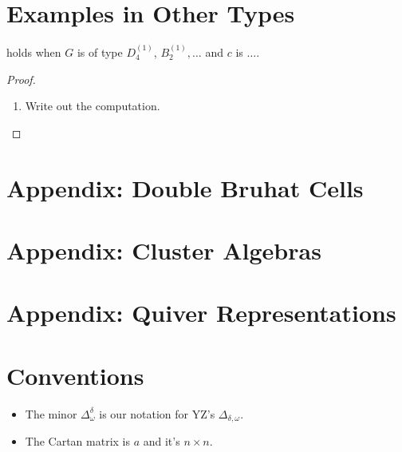 \documentclass[11pt]{amsart}
\begin{document}
\section{Examples in Other Types}

\begin{proposition}
 holds when $G$ is of type $D_4^{(1)}$, $B_2^{(1)},\dotsc$ and $c$ is $\dotsc$. 
\end{proposition}
\begin{proof}
\begin{enumerate}
\item Write out the computation.
\end{enumerate}
\end{proof}

\section{Appendix: Double Bruhat Cells}
\section{Appendix: Cluster Algebras}
\section{Appendix: Quiver Representations}

\section{Conventions}

\begin{itemize}
\item The minor $\Delta_\omega^\delta$ is our notation for YZ's $\Delta_{\delta, \omega}$.
\item The Cartan matrix is $a$ and it's $n \times n$.
\end{itemize}
\end{document}
